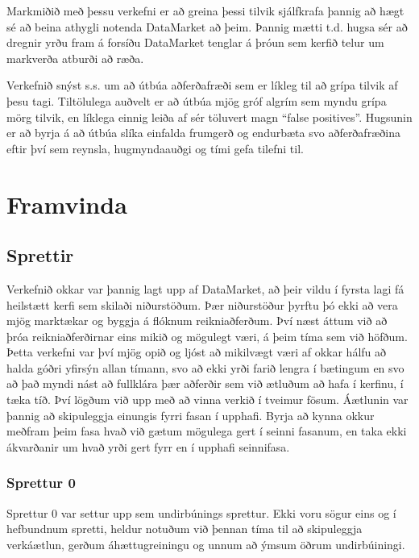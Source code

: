 \documentclass{article}
\begin{document}
Markmiðið með þessu verkefni er að greina þessi tilvik
sjálfkrafa þannig að hægt sé að beina athygli notenda
DataMarket að þeim. Þannig mætti t.d. hugsa sér að
dregnir yrðu fram á forsíðu DataMarket tenglar á þróun
sem kerfið telur um markverða atburði að ræða.

Verkefnið snýst s.s. um að útbúa aðferðafræði sem er
líkleg til að grípa tilvik af þesu tagi. Tiltölulega
auðvelt er að útbúa mjög gróf algrím sem myndu grípa
mörg tilvik, en líklega einnig leiða af sér töluvert
magn “false positives”. Hugsunin er að byrja á að útbúa
slíka einfalda frumgerð og endurbæta svo aðferðafræðina
eftir því sem reynsla, hugmyndaauðgi og tími gefa
tilefni til.

\newpage

\section{Framvinda}
\subsection{Sprettir}
Verkefnið okkar var þannig lagt upp af DataMarket, að þeir vildu í fyrsta lagi fá heilstætt kerfi sem skilaði niðurstöðum. 
Þær niðurstöður þyrftu þó ekki að vera mjög marktækar og byggja á flóknum reikniaðferðum. Því næst áttum við að þróa reikniaðferðirnar eins 
mikið og mögulegt væri, á þeim tíma sem við höfðum. Þetta verkefni var því mjög opið og ljóst að mikilvægt væri 
af okkar hálfu að halda góðri yfirsýn allan tímann, svo að ekki yrði farið lengra í bætingum en svo að það myndi nást að fullklára þær 
aðferðir sem við ætluðum að hafa í kerfinu, í tæka tíð. Því lögðum við upp með að vinna verkið í tveimur fösum. Áætlunin var þannig að skipuleggja
einungis fyrri fasan í upphafi. Byrja að kynna okkur meðfram þeim fasa hvað við gætum mögulega gert í seinni fasanum, en taka ekki ákvarðanir 
um hvað yrði gert fyrr en í upphafi seinnifasa.

\subsubsection{Sprettur 0}
Sprettur 0 var settur upp sem undirbúnings sprettur. Ekki voru sögur eins og í
hefbundnum spretti, heldur notuðum við þennan tíma til að 
skipuleggja verkáætlun, gerðum áhættugreiningu og unnum að ýmsum öðrum
undirbúiningi.
\end{document}
